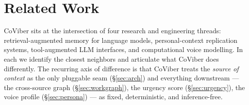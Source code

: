 
\section{Related Work}
\label{sec:related}

CoViber sits at the intersection of four research and engineering threads: retrieval-augmented memory for language models, personal-context replication systems, tool-augmented LLM interfaces, and computational voice modelling. In each we identify the closest neighbors and articulate what CoViber does differently. The recurring axis of difference is that CoViber treats the \emph{source of context} as the only pluggable seam (\S\ref{sec:arch}) and everything downstream --- the cross-source graph (\S\ref{sec:workgraph}), the urgency score (\S\ref{sec:urgency}), the voice profile (\S\ref{sec:persona}) --- as fixed, deterministic, and inference-free.

